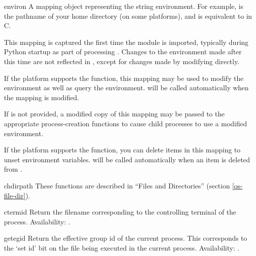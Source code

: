 \begin{datadesc}{environ}
A mapping object representing the string environment. For example,
 is the pathname of your home directory (on some
platforms), and is equivalent to  in C.

This mapping is captured the first time the  module is
imported, typically during Python startup as part of processing
.  Changes to the environment made after this time are
not reflected in , except for changes made by modifying
 directly.

If the platform supports the  function, this
mapping may be used to modify the environment as well as query the
environment.   will be called automatically when
the mapping is modified.

If  is not provided, a modified copy of this mapping 
may be passed to the appropriate process-creation functions to cause 
child processes to use a modified environment.

If the platform supports the  function, you can 
delete items in this mapping to unset environment variables.
 will be called automatically when an item is
deleted from .

\end{datadesc}

\begin{funcdescni}{chdir}{path}
These functions are described in ``Files and Directories'' (section
\ref{os-file-dir}).
\end{funcdescni}

\begin{funcdesc}{ctermid}{}
Return the filename corresponding to the controlling terminal of the
process.
Availability: \UNIX.
\end{funcdesc}

\begin{funcdesc}{getegid}{}
Return the effective group id of the current process.  This
corresponds to the `set id' bit on the file being executed in the
current process.
Availability: \UNIX.
\end{funcdesc}

